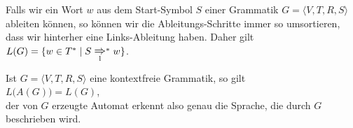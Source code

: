 \remark
Falls wir ein Wort $w$ aus dem Start-Symbol $S$ einer Grammatik $G = \langle V, T, R, S \rangle$ ableiten
k\"onnen, so k\"onnen wir die Ableitungs-Schritte immer so umsortieren, dass wir hinterher eine Links-Ableitung 
haben. Daher gilt
\\[0.2cm]
\hspace*{1.3cm}
$L(G) = \{ w \in T^* \mid S \;
           \raisebox{-2.3mm}{$\stackrel{\mbox{\large$\Rightarrow$}}{\mbox{\scriptsize l}}^*$}\; w \}$.

\begin{Satz}
  Ist $G = \langle V, T, R, S \rangle$ eine kontextfreie Grammatik, so gilt
  \\[0.2cm]
  \hspace*{1.3cm}
  $L\bigl(A(G)\bigr) = L(G)$,
  \\[0.2cm]
  der von $G$ erzeugte Automat erkennt also genau die Sprache, die durch $G$ beschrieben wird.
\end{Satz}

